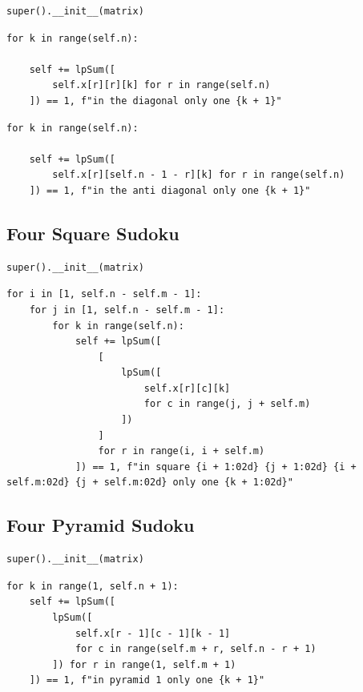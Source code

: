 \documentclass[12pt]{article}
\begin{document}
\begin{lstlisting}[caption={TODO}]
super().__init__(matrix)
\end{lstlisting}

\begin{lstlisting}[caption={TODO}]
for k in range(self.n):

    self += lpSum([
        self.x[r][r][k] for r in range(self.n)
    ]) == 1, f"in the diagonal only one {k + 1}"
\end{lstlisting}

\begin{lstlisting}[caption={TODO}]
for k in range(self.n):

    self += lpSum([
        self.x[r][self.n - 1 - r][k] for r in range(self.n)
    ]) == 1, f"in the anti diagonal only one {k + 1}"
\end{lstlisting}

\pagebreak

\subsection{Four Square Sudoku}

\begin{lstlisting}[caption={TODO}]
super().__init__(matrix)
\end{lstlisting}

\begin{lstlisting}[caption={TODO}]
for i in [1, self.n - self.m - 1]:
    for j in [1, self.n - self.m - 1]:
        for k in range(self.n):
            self += lpSum([
                [
                    lpSum([
                        self.x[r][c][k]
                        for c in range(j, j + self.m)
                    ])
                ]
                for r in range(i, i + self.m)
            ]) == 1, f"in square {i + 1:02d} {j + 1:02d} {i + self.m:02d} {j + self.m:02d} only one {k + 1:02d}"
\end{lstlisting}

\pagebreak

\subsection{Four Pyramid Sudoku}

\begin{lstlisting}[caption={TODO}]
super().__init__(matrix)
\end{lstlisting}

\begin{lstlisting}[caption={TODO}]
for k in range(1, self.n + 1):
    self += lpSum([
        lpSum([
            self.x[r - 1][c - 1][k - 1]
            for c in range(self.m + r, self.n - r + 1)
        ]) for r in range(1, self.m + 1)
    ]) == 1, f"in pyramid 1 only one {k + 1}"
\end{lstlisting}
\end{document}

